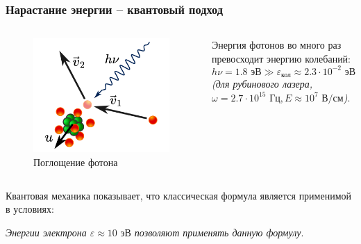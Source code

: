 \documentclass{beamer}
\begin{document}
	\begin{frame}
		\frametitle{Нарастание энергии -- квантовый подход}
		
		\begin{columns}
			\begin{figure}
				\centering
				\includegraphics[width=0.8\linewidth]{res/collision_with_recoil.png}
				\caption*{Поглощение фотона}
			\end{figure}
			
			Энергия фотонов во много раз превосходит энергию колебаний:
			$$  h\nu = 1.8 \text{ эВ} \gg\varepsilon_{\text{кол}} \approx 2.3\cdot 10^{-2} \text{ эВ} $$
			\footnotesize
			\emph{(для рубинового лазера, $\omega = 2.7 \cdot 10^{15} \text{ Гц}, E \approx 10^7 \text{ В/см}$)}.
		\end{columns}
		
		Квантовая механика показывает, что классическая формула является применимой в условиях: 
		\begin{center}
		\end{center}

		\footnotesize
		\emph{Энергии электрона $\varepsilon \approx 10 \text{ эВ}$ позволяют применять данную формулу}.
		
		
		
%		
%		
%		
	\end{frame}
	
\end{document}
